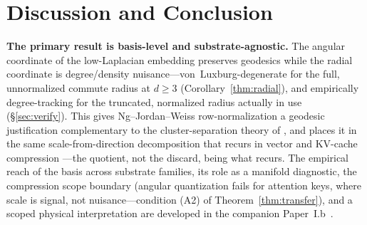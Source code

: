 \documentclass[11pt]{article}
\theoremstyle{remark}
\begin{document}
\section{Discussion and Conclusion}\label{sec:disc}
\textbf{The primary result is basis-level and substrate-agnostic.} The angular
coordinate of the low-Laplacian embedding preserves geodesics while the radial
coordinate is degree/density nuisance---von~Luxburg-degenerate for the full,
unnormalized commute radius at $d\ge3$ (Corollary~\ref{thm:radial}), and
empirically degree-tracking for the truncated, normalized radius actually in use
(\S\ref{sec:verify}). This gives Ng--Jordan--Weiss
row-normalization a geodesic justification complementary to the cluster-separation
theory of \cite{schiebinger2015}, and places it in the same scale-from-direction
decomposition that recurs in vector and KV-cache compression \cite{polarquant2025}
---the quotient, not the discard, being what recurs. The empirical reach of the
basis across substrate families, its role as a manifold diagnostic, the compression
scope boundary (angular quantization fails for attention keys, where scale is
signal, not nuisance---condition (A2) of Theorem~\ref{thm:transfer}), and a scoped
physical interpretation are developed in the companion Paper~I.b~\cite{paperIb}.
\end{document}
